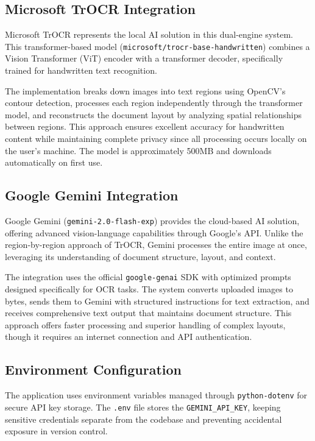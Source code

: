 \documentclass[12pt,a4paper]{article}
\begin{document}
\subsection{Microsoft TrOCR Integration}
Microsoft TrOCR represents the local AI solution in this dual-engine system. This transformer-based model (\texttt{microsoft/trocr-base-handwritten}) combines a Vision Transformer (ViT) encoder with a transformer decoder, specifically trained for handwritten text recognition. 

The implementation breaks down images into text regions using OpenCV's contour detection, processes each region independently through the transformer model, and reconstructs the document layout by analyzing spatial relationships between regions. This approach ensures excellent accuracy for handwritten content while maintaining complete privacy since all processing occurs locally on the user's machine. The model is approximately 500MB and downloads automatically on first use.

\subsection{Google Gemini Integration}
Google Gemini (\texttt{gemini-2.0-flash-exp}) provides the cloud-based AI solution, offering advanced vision-language capabilities through Google's API. Unlike the region-by-region approach of TrOCR, Gemini processes the entire image at once, leveraging its understanding of document structure, layout, and context.

The integration uses the official \texttt{google-genai} SDK with optimized prompts designed specifically for OCR tasks. The system converts uploaded images to bytes, sends them to Gemini with structured instructions for text extraction, and receives comprehensive text output that maintains document structure. This approach offers faster processing and superior handling of complex layouts, though it requires an internet connection and API authentication.

\subsection{Environment Configuration}
The application uses environment variables managed through \texttt{python-dotenv} for secure API key storage. The \texttt{.env} file stores the \texttt{GEMINI\_API\_KEY}, keeping sensitive credentials separate from the codebase and preventing accidental exposure in version control.
\end{document}
